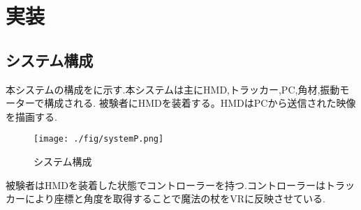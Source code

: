\chapter{実装}
\section{システム構成}

本システムの構成をに示す.本システムは主にHMD,トラッカー,PC,角材,振動モーターで構成される.
被験者にHMDを装着する。HMDはPCから送信された映像を描画する.

\begin{figure}[b]
\centering
\texttt{[image: ./fig/systemP.png]}
\caption{システム構成}\label{sys}
\end{figure}

被験者はHMDを装着した状態でコントローラーを持つ.コントローラーはトラッカーにより座標と角度を取得することで魔法の杖をVRに反映させている.








\begin{comment}
    \begin{textblock}{2}(1, 16.5)
        空行→
    \end{textblock}
    
    \begin{textblock}{2}(1, 18.5)
        字下げ→
    \end{textblock}
        
    \begin{textblock}{2}(1, 20.5)
        空行→
    \end{textblock}
    
    \begin{textblock}{11}(9, 20.5)
        ←読点までが元の文なので文献番号はその後につける
    \end{textblock}
    
    \begin{textblock}{7}(14, 26.5)
        ↑同じく読点までが元の文なので
    
        "」"と文献番号はその後につける
    \end{textblock}
\end{comment}




\begin{comment}
    \begin{textblock}{11}(9, 7.5)
        \noindent
        ↑間接引用では節末・文末の句読点の「前」に文献番号をつける
    \end{textblock}
\end{comment}




